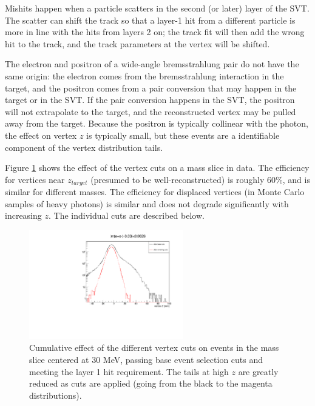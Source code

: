 Mishits happen when a particle scatters in the second (or later) layer of the SVT.
The scatter can shift the track so that a layer-1 hit from a different particle is more in line with the hits from layers 2 on; the track fit will then add the wrong hit to the track, and the track parameters at the vertex will be shifted.

The electron and positron of a wide-angle bremsstrahlung pair do not have the same origin: the electron comes from the bremsstrahlung interaction in the target, and the positron comes from a pair conversion that may happen in the target or in the SVT.
If the pair conversion happens in the SVT, the positron will not extrapolate to the target, and the reconstructed vertex may be pulled away from the target.
Because the positron is typically collinear with the photon, the effect on vertex $z$ is typically small, but these events are a identifiable component of the vertex distribution tails.

Figure \ref{fig:vertcut_performance} shows the effect of the vertex cuts on a mass slice in data. The efficiency for vertices near $z_{target}$ (presumed to be well-reconstructed) is roughly 60\%, and is similar for different masses.
The efficiency for displaced vertices (in Monte Carlo samples of heavy photons) is similar and does not degrade significantly with increasing $z$.
The individual cuts are described below.

\begin{figure}[ht]
\begin{center}
    \includegraphics[width=0.6\textwidth,page=2,angle=-90]{vertexing/figs/vertcutplots}
\end{center}
    \caption{Cumulative effect of the different vertex cuts on events in the mass slice centered at 30 MeV, passing base event selection cuts and meeting the layer 1 hit requirement.
    The tails at high $z$ are greatly reduced as cuts are applied (going from the black to the magenta distributions).
    }
    \label{fig:vertcut_performance}
\end{figure}

